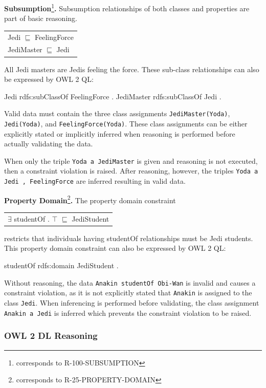 \documentclass{llncs}
\newcommand{\ms}[1]{\texttt{#1}}
\newenvironment{DL}{
  \scriptsize
  \sffamily
  \vspace{0.3cm}
  \begin{tabular}{l}

}{
  \end{tabular}
  \linebreak
}
\begin{document}
\textbf{Subsumption}\footnote{corresponds to R-100-SUBSUMPTION}\textbf{.}
Subsumption relationships of both classes and properties are part of basic reasoning.

\begin{DL}
Jedi $\sqsubseteq$ FeelingForce \\
JediMaster $\sqsubseteq$ Jedi \\
\end{DL}

All Jedi masters are Jedis feeling the force.
These sub-class relationships can also be expressed by OWL 2 QL:

\begin{ex}
Jedi rdfs:subClassOf FeelingForce . 
JediMaster rdfs:subClassOf Jedi . 
\end{ex}

Valid data must contain the three class assignments \ms{JediMaster(Yoda)}, \ms{Jedi(Yoda)}, and \ms{FeelingForce(Yoda)}.
These class assignments can be either explicitly stated or implicitly inferred when reasoning is performed before actually validating the data.

When only the triple \ms{Yoda a JediMaster} is given and reasoning is not executed, then a constraint violation is raised.
After reasoning, however, the triples \ms{Yoda a Jedi , FeelingForce} are inferred resulting in valid data. 

\textbf{Property Domain}\footnote{corresponds to R-25-PROPERTY-DOMAIN}\textbf{.}
The property domain constraint

\begin{DL}
$\exists$ studentOf . $\top$ $\sqsubseteq$ JediStudent \\
\end{DL}

restricts that individuals having studentOf relationships must be Jedi students.
This property domain constraint can also be expressed by OWL 2 QL:

\begin{ex}
studentOf rdfs:domain JediStudent .
\end{ex}

Without reasoning, the data \ms{Anakin studentOf Obi-Wan} is invalid and causes a constraint violation, as it is not explicitly stated that \ms{Anakin} is assigned to the class \ms{Jedi}. 
When inferencing is performed before validating, the class assignment \ms{Anakin a Jedi} is inferred which prevents the constraint violation to be raised.

\subsubsection{OWL 2 DL Reasoning}
\end{document}
